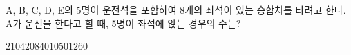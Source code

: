 A, B, C, D, E의 5명이 운전석을 포함하여 8개의 좌석이 있는 승합차를 타려고 한다. A가 운전을 한다고 할 때, 5명이 좌석에 앉는 경우의 수는?
\begin{choices32}{$210$}{$420$}{$840$}{$1050$}{$1260$}\end{choices32}
